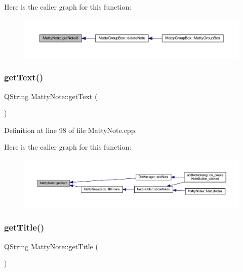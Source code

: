 Here is the caller graph for this function\+:
\nopagebreak
\begin{figure}[H]
\begin{center}
\leavevmode
\includegraphics[width=350pt]{classMattyNote_ad7c5837f61e4813005ae063c67b9a0f0_icgraph}
\end{center}
\end{figure}
\hypertarget{classMattyNote_a9213ac15a09625f59a95ede1b1470308}{}\label{classMattyNote_a9213ac15a09625f59a95ede1b1470308} 
\subsubsection{\texorpdfstring{get\+Text()}{getText()}}
{\footnotesize\ttfamily Q\+String Matty\+Note\+::get\+Text (\begin{DoxyParamCaption}{ }\end{DoxyParamCaption})}



Definition at line 98 of file Matty\+Note.\+cpp.

Here is the caller graph for this function\+:
\nopagebreak
\begin{figure}[H]
\begin{center}
\leavevmode
\includegraphics[width=350pt]{classMattyNote_a9213ac15a09625f59a95ede1b1470308_icgraph}
\end{center}
\end{figure}
\hypertarget{classMattyNote_acb4af77f4177a0b17f140d4b4421e32e}{}\label{classMattyNote_acb4af77f4177a0b17f140d4b4421e32e} 
\subsubsection{\texorpdfstring{get\+Title()}{getTitle()}}
{\footnotesize\ttfamily Q\+String Matty\+Note\+::get\+Title (\begin{DoxyParamCaption}{ }\end{DoxyParamCaption})}



